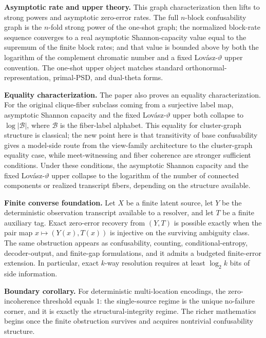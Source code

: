 \noindent\textbf{Asymptotic rate and upper theory.} This graph characterization then lifts to strong powers and asymptotic zero-error rates. The full $n$-block confusability graph is the $n$-fold strong power of the one-shot graph; the normalized block-rate sequence converges to a real asymptotic Shannon-capacity value equal to the supremum of the finite block rates; and that value is bounded above by both the logarithm of the complement chromatic number and a fixed Lov\'asz-$\vartheta$ upper convention. The one-shot upper object matches standard orthonormal-representation, primal-PSD, and dual-theta forms. 

\noindent\textbf{Equality characterization.} The paper also proves an equality characterization. For the original clique-fiber subclass coming from a surjective label map, asymptotic Shannon capacity and the fixed Lov\'asz-$\vartheta$ upper both collapse to $\log |\mathcal B|$, where $\mathcal B$ is the fiber-label alphabet. This equality for cluster-graph structure is classical; the new point here is that transitivity of base confusability gives a model-side route from the view-family architecture to the cluster-graph equality case, while meet-witnessing and fiber coherence are stronger sufficient conditions. Under these conditions, the asymptotic Shannon capacity and the fixed Lov\'asz-$\vartheta$ upper collapse to the logarithm of the number of connected components or realized transcript fibers, depending on the structure available. 

\noindent\textbf{Finite converse foundation.} Let $X$ be a finite latent source, let $Y$ be the deterministic observation transcript available to a resolver, and let $T$ be a finite auxiliary tag. Exact zero-error recovery from $(Y,T)$ is possible exactly when the pair map $x \mapsto (Y(x),T(x))$ is injective on the surviving ambiguity class. The same obstruction appears as confusability, counting, conditional-entropy, decoder-output, and finite-gap formulations, and it admits a budgeted finite-error extension. In particular, exact $k$-way resolution requires at least $\log_2 k$ bits of side information.

\noindent\textbf{Boundary corollary.} For deterministic multi-location encodings, the zero-incoherence threshold equals $1$: the single-source regime is the unique no-failure corner, and it is exactly the structural-integrity regime. The richer mathematics begins once the finite obstruction survives and acquires nontrivial confusability structure.

